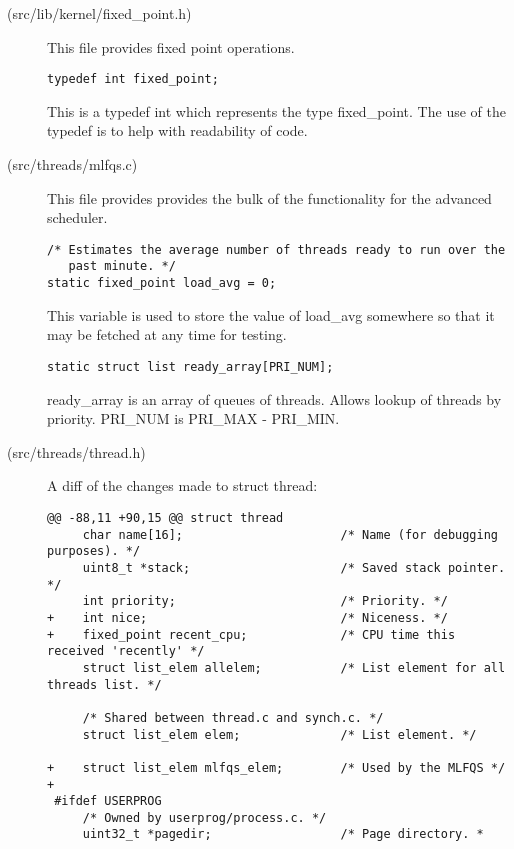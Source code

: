\begin{description}

\item[(src/lib/kernel/fixed\_point.h)] This file provides fixed point
  operations.

\begin{verbatim}
typedef int fixed_point;
\end{verbatim}
  This is a typedef int which represents the type fixed\_point. The use
  of the typedef is to help with readability of code.

\item[(src/threads/mlfqs.c)] This file provides provides the bulk of the
  functionality for the advanced scheduler.

\begin{verbatim}
/* Estimates the average number of threads ready to run over the
   past minute. */
static fixed_point load_avg = 0;
\end{verbatim}

  This variable is used to store the value of load_avg somewhere so that it may
  be fetched at any time for testing.

\begin{verbatim}
static struct list ready_array[PRI_NUM];
\end{verbatim}

  ready_array is an array of queues of threads. Allows lookup of threads by
  priority. PRI_NUM is PRI_MAX - PRI_MIN.

\item[(src/threads/thread.h)]
  A diff of the changes made to struct thread:

\begin{verbatim}
@@ -88,11 +90,15 @@ struct thread
     char name[16];                      /* Name (for debugging purposes). */
     uint8_t *stack;                     /* Saved stack pointer. */
     int priority;                       /* Priority. */
+    int nice;                           /* Niceness. */
+    fixed_point recent_cpu;             /* CPU time this received 'recently' */
     struct list_elem allelem;           /* List element for all threads list. */

     /* Shared between thread.c and synch.c. */
     struct list_elem elem;              /* List element. */

+    struct list_elem mlfqs_elem;        /* Used by the MLFQS */
+
 #ifdef USERPROG
     /* Owned by userprog/process.c. */
     uint32_t *pagedir;                  /* Page directory. *
\end{verbatim}


\end{description}
